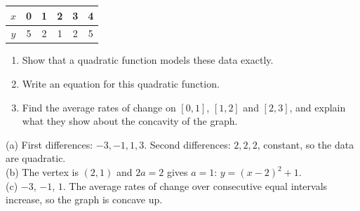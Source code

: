 \begin{exo}{}
\begin{center}\begin{tabular}{c|ccccc}$x$&0&1&2&3&4\\\hline$y$&5&2&1&2&5\end{tabular}\end{center}
\begin{enumerate}[label=(\alph*)]
\item Show that a quadratic function models these data exactly.
\item Write an equation for this quadratic function.
\item Find the average rates of change on $[0,1]$, $[1,2]$ and $[2,3]$, and explain what they show about the concavity of the graph.
\end{enumerate}
\begin{solution}
(a) First differences: $-3,-1,1,3$. Second differences: $2,2,2$, constant, so the data are quadratic.\\
(b) The vertex is $(2,1)$ and $2a=2$ gives $a=1$: $y=(x-2)^2+1$.\\
(c) $-3$, $-1$, $1$. The average rates of change over consecutive equal intervals increase, so the graph is concave up.
\end{solution}
\end{exo}

